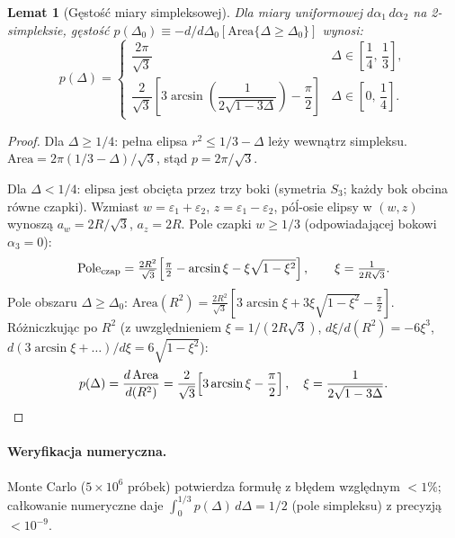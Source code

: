 \documentclass[11pt,a4paper]{article}
\newcommand{\Dt}{\Delta}
\newtheorem{lemma}[theorem]{Lemat}
\begin{document}
\begin{lemma}[G\k{e}sto\'s\'c miary simpleksowej]
\label{lem:density}
Dla miary uniformowej $d\alpha_1\,d\alpha_2$ na 2-simpleksie,
g\k{e}sto\'s\'c $p(\Delta_0) \equiv -d/d\Delta_0[\text{Area}\{\Delta\ge\Delta_0\}]$ wynosi:
\begin{equation}
\label{eq:density_exact}
\boxed{
p(\Dt) = \begin{cases}
\dfrac{2\pi}{\sqrt{3}} & \Dt\in\left[\dfrac{1}{4},\,\dfrac{1}{3}\right], \\[8pt]
\dfrac{2}{\sqrt{3}}\!\left[3\arcsin\!\left(\dfrac{1}{2\sqrt{1-3\Dt}}\right)
 - \dfrac{\pi}{2}\right] & \Dt\in\left[0,\,\dfrac{1}{4}\right].
\end{cases}
}
\end{equation}
\end{lemma}

\begin{proof}
Dla $\Dt\ge1/4$: pe\l{}na elipsa $r^2\le 1/3-\Dt$ le\.{z}y wewn\k{a}trz simpleksu.
$\text{Area}=2\pi(1/3-\Dt)/\sqrt3$, st\k{a}d $p=2\pi/\sqrt3$.

Dla $\Dt<1/4$: elipsa jest obci\k{e}ta przez trzy boki (symetria $S_3$; ka\.{z}dy bok
obcina r\'owne czapki). Wzmiast $w=\varepsilon_1+\varepsilon_2$, $z=\varepsilon_1-\varepsilon_2$,
p\'o\'l-osie elipsy w $(w,z)$ wynosz\k{a} $a_w=2R/\sqrt3$, $a_z=2R$.
Pole czapki $w\ge1/3$ (odpowiadaj\k{a}cej bokowi $\alpha_3=0$):
\[
\text{Pole}_{\rm czap} = \tfrac{2R^2}{\sqrt3}\!\left[\tfrac\pi2 - \arcsin\xi - \xi\sqrt{1-\xi^2}\right],
\qquad \xi=\tfrac{1}{2R\sqrt3}.
\]
Pole obszaru $\Dt\ge\Dt_0$:
$\text{Area}(R^2)=\tfrac{2R^2}{\sqrt3}\!\left[3\arcsin\xi+3\xi\sqrt{1-\xi^2}-\tfrac\pi2\right]$.
R\'o\.{z}niczkuj\k{a}c po $R^2$ (z uwzgl\k{e}dnieniem $\xi=1/(2R\sqrt3)$,
$d\xi/d(R^2)=-6\xi^3$, $d(3\arcsin\xi+\ldots)/d\xi=6\sqrt{1-\xi^2}$):
\[
p(\Dt) = \frac{d\,\text{Area}}{d(R^2)} = \frac{2}{\sqrt3}\!\left[3\arcsin\xi-\frac\pi2\right],
\quad \xi=\frac{1}{2\sqrt{1-3\Dt}}.
\qedhere
\]
\end{proof}

\paragraph{Weryfikacja numeryczna.} Monte Carlo ($5\times10^6$ pr\'obek) potwierdza
formu\l{}\k{e} z b\l{}\k{e}dem wzgl\k{e}dnym $<1\%$; ca\l{}kowanie numeryczne daje
$\int_0^{1/3}p(\Dt)\,d\Dt = 1/2$ (pole simpleksu) z precyzj\k{a} $<10^{-9}$.

\end{document}
